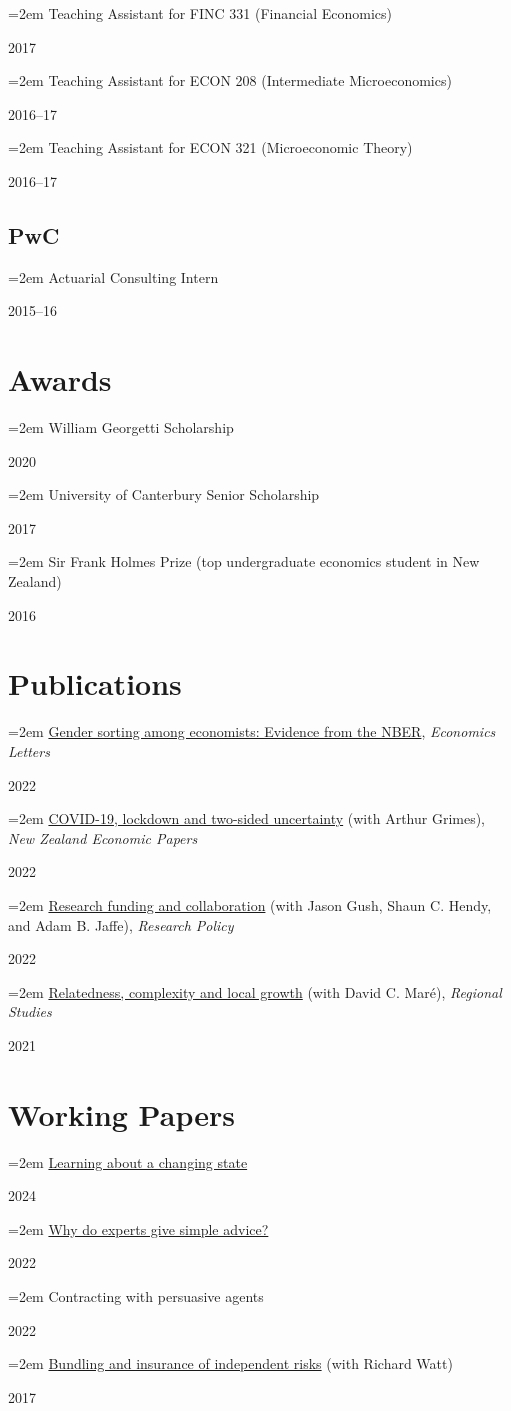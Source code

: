 \documentclass[11pt,oneside]{memoir}
\newcommand{\entry}[2]{\par\parbox[t]{0.9\linewidth}{\strut\raggedright\hangindent=2em #2\strut}\hfill#1}
\begin{document}
		\entry{2017}{Teaching Assistant for FINC 331 (Financial Economics)}
		\entry{2016--17}{Teaching Assistant for ECON 208 (Intermediate Microeconomics)}
		\entry{2016--17}{Teaching Assistant for ECON 321 (Microeconomic Theory)}
	
	\subsection{PwC}
	
		\entry{2015--16}{Actuarial Consulting Intern}
	
	\section{Awards}
	
		\entry{2020}{William Georgetti Scholarship}
		\entry{2017}{University of Canterbury Senior Scholarship}
		\entry{2016}{Sir Frank Holmes Prize (top undergraduate economics student in New Zealand)}
	
	\section{Publications}
	
		\entry{2022}{\href{https://doi.org/10.1016/j.econlet.2022.110640}{Gender sorting among economists: Evidence from the NBER}, \emph{Economics Letters}}
		\entry{2022}{\href{https://doi.org/10.1080/00779954.2020.1806340}{COVID-19, lockdown and two-sided uncertainty} (with Arthur Grimes), \emph{New Zealand Economic Papers}}
		\entry{2022}{\href{https://doi.org/10.1016/j.respol.2021.104421}{Research funding and collaboration} (with Jason Gush, Shaun C. Hendy, and Adam B. Jaffe), \emph{Research Policy}}
		\entry{2021}{\href{https://doi.org/10.1080/00343404.2020.1802418}{Relatedness, complexity and local growth} (with David C. Maré), \emph{Regional Studies}}
	
	\section{Working Papers}
	
		\entry{2024}{\href{https://arxiv.org/abs/2401.03607}{Learning about a changing state}}
		\entry{2022}{\href{https://arxiv.org/abs/2209.11710}{Why do experts give simple advice?}}
		\entry{2022}{Contracting with persuasive agents}
		\entry{2017}{\href{http://www.econ.canterbury.ac.nz/RePEc/cbt/econwp/1705.pdf}{Bundling and insurance of independent risks} (with Richard Watt)}
	
\end{document}
